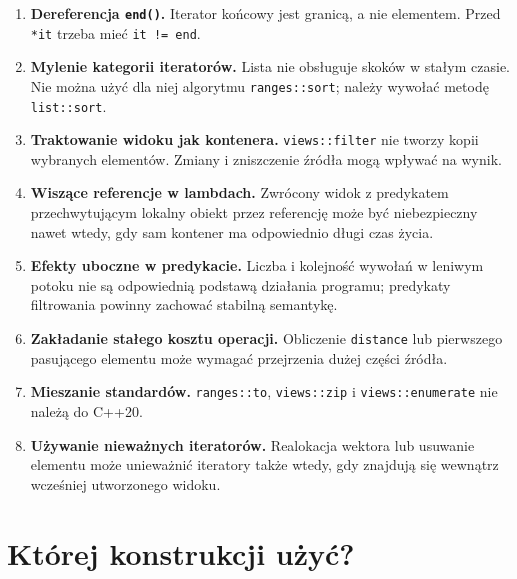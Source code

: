 \begin{enumerate}
\item \textbf{Dereferencja \texttt{end()}.} Iterator końcowy jest
granicą, a nie elementem. Przed \texttt{*it} trzeba mieć
\texttt{it != end}.

\item \textbf{Mylenie kategorii iteratorów.} Lista nie obsługuje
skoków w stałym czasie. Nie można użyć dla niej algorytmu
\texttt{ranges::sort}; należy wywołać metodę \texttt{list::sort}.

\item \textbf{Traktowanie widoku jak kontenera.} \texttt{views::filter}
nie tworzy kopii wybranych elementów. Zmiany i zniszczenie źródła
mogą wpływać na wynik.

\item \textbf{Wiszące referencje w lambdach.} Zwrócony widok
z predykatem przechwytującym lokalny obiekt przez referencję może
być niebezpieczny nawet wtedy, gdy sam kontener ma odpowiednio długi
czas życia.

\item \textbf{Efekty uboczne w predykacie.} Liczba i kolejność
wywołań w leniwym potoku nie są odpowiednią podstawą działania
programu; predykaty filtrowania powinny zachować stabilną semantykę.

\item \textbf{Zakładanie stałego kosztu operacji.} Obliczenie
\texttt{distance} lub pierwszego pasującego elementu może wymagać
przejrzenia dużej części źródła.

\item \textbf{Mieszanie standardów.} \texttt{ranges::to},
\texttt{views::zip} i \texttt{views::enumerate} nie należą do C++20.

\item \textbf{Używanie nieważnych iteratorów.} Realokacja wektora
lub usuwanie elementu może unieważnić iteratory także wtedy, gdy
znajdują się wewnątrz wcześniej utworzonego widoku.
\end{enumerate}

\section{Której konstrukcji użyć?}


